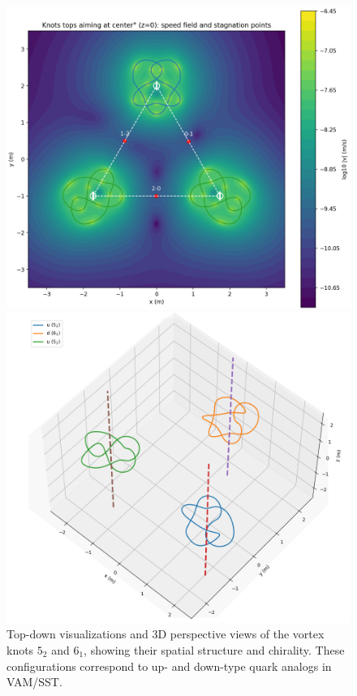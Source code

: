 \documentclass[12pt]{article}
\begin{document}
\begin{figure}[H]
\centering
\begin{minipage}{0.25\textwidth}
    \centering
             \includegraphics[width=\textwidth]{images/3quarcks}
\end{minipage}
\hspace{1em}
\begin{minipage}{0.25\textwidth}
    \centering
            \includegraphics[width=\textwidth]{images/3quarcks3d}
\end{minipage}
     \caption{Top-down visualizations and 3D perspective views of the vortex knots \(5_2\) and \(6_1\), showing their spatial structure and chirality. These configurations correspond to up- and down-type quark analogs in VAM/SST.}
\end{figure}
\end{document}
